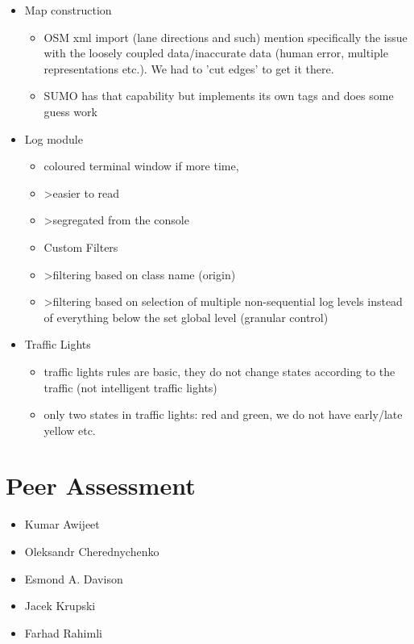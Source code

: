 \begin{itemize}
    \item Map construction
    \begin{itemize}
        \item OSM xml import (lane directions and such)
        \itme mention specifically the issue with the loosely coupled data/inaccurate data (human error, multiple representations etc.). We had to 'cut edges' to get it there.
        \item SUMO has that capability but implements its own tags and does some guess work
    \end{itemize}

    \item Log module
    \begin{itemize}
        \item coloured terminal window if more time,
        \item >easier to read
        \item >segregated from the console
        \item Custom Filters
        \item >filtering based on class name (origin)
        \item >filtering based on selection of multiple non-sequential log levels instead of everything below the set global level (granular control)
    \end{itemize}

     \item Traffic Lights
     \begin{itemize}
        \item traffic lights rules are basic, they do not change states according to the traffic (not intelligent traffic lights)
        \item only two states in traffic lights: red and green, we do not have early/late yellow etc. 
     \end{itemize}
\end{itemize}



\section{Peer Assessment}

 \begin{itemize}
        \item Kumar Awijeet
		\item Oleksandr Cherednychenko
		\item Esmond A. Davison
		\item Jacek Krupski
		\item Farhad Rahimli
    \end{itemize}
